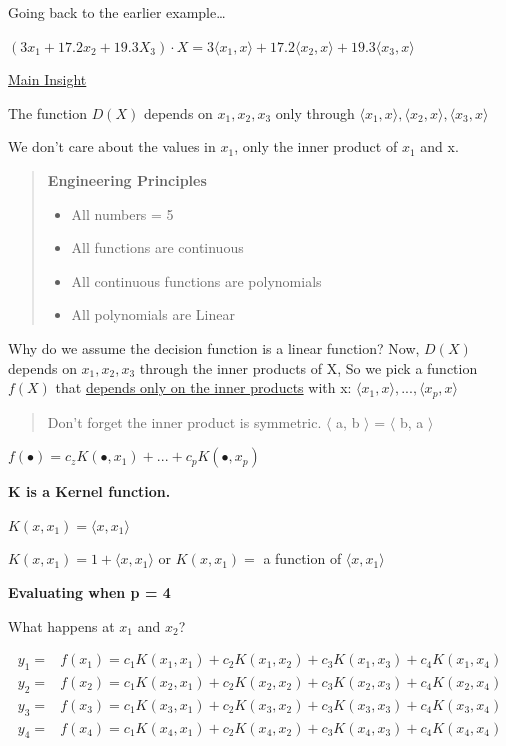 \documentclass[11pt]{article}
\begin{document}
Going back to the earlier example\ldots{}

\((3 x_1 + 17.2 x_2 + 19.3 X_3) \cdot X = 3 \langle x_1, x \rangle + 17.2 \langle
x_2, x \rangle + 19.3 \langle x_3, x \rangle\)

\uline{Main Insight}

The function \(D(X)\) depends on \(x_1, x_2, x_3\) only through \(\langle x_1, x \rangle, \langle x_2, x \rangle, \langle x_3, x \rangle\)

We don't care about the values in \(x_1\), only the inner product of \(x_1\) and x.

\begin{quote}
\textbf{Engineering Principles}

\begin{itemize}
\item All numbers = 5
\item All functions are continuous
\item All continuous functions are polynomials
\item All polynomials are Linear
\end{itemize}
\end{quote}

Why do we assume the decision function is a linear function? Now, \(D(X)\) depends
on \(x_1, x_2, x_3\) through the inner products of X, So we pick a function \(f(X)\)
that \uline{depends only on the inner products} with x: \(\langle x_1, x \rangle, ..., \langle x_p, x \rangle\)

\begin{quote}
Don't forget the inner product is symmetric. \(\langle\) a, b \(\rangle\) = \(\langle\) b, a \(\rangle\)
\end{quote}

\(f(\bullet) = c_z K(\bullet, x_1) + ... + c_p K(\bullet, x_p)\)

\textbf{K is a Kernel function.}

\(K (x, x_1) = \langle x, x_1 \rangle\)

\(K (x, x_1) = 1 + \langle x, x_1 \rangle\) or \(K (x, x_1) =\) a function of \(\langle x, x_1 \rangle\)

\textbf{Evaluating when p = 4}

What happens at \(x_1\) and \(x_2\)?

\begin{equation}
\begin{split}
y_1 = & f(x_1) =  c_1 K (x_1, x_1) + c_2 K (x_1, x_2) + c_3 K (x_1, x_3) + c_4 K (x_1, x_4)\\
y_2 = & f(x_2) =  c_1 K (x_2, x_1) + c_2 K (x_2, x_2) + c_3 K (x_2, x_3) + c_4 K (x_2, x_4)\\
y_3 = & f(x_3) =  c_1 K (x_3, x_1) + c_2 K (x_3, x_2) + c_3 K (x_3, x_3) + c_4 K (x_3, x_4)\\
y_4 = & f(x_4) =  c_1 K (x_4, x_1) + c_2 K (x_4, x_2) + c_3 K (x_4, x_3) + c_4 K (x_4, x_4)\\
\end{split}
\end{equation}
\end{document}
